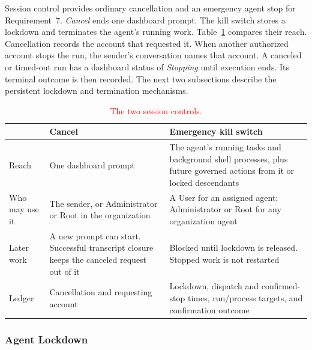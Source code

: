 {\color{red}Session control provides ordinary cancellation and an emergency agent stop
for Requirement~7. \textit{Cancel} ends one dashboard prompt. The kill
switch stores a lockdown and terminates the agent's running work.
Table~\ref{tab:gov-session-controls} compares their reach. Cancellation records
the account that requested it. When another authorized account stops the run,
the sender's conversation names that account. A canceled or timed-out run
has a dashboard status of \textit{Stopping} until execution ends. Its terminal
outcome is then recorded.
The next two subsections describe the persistent lockdown and termination
mechanisms.}

\begin{table}[htbp]
\centering
\caption{\textcolor{red}{The two session controls.}}
\label{tab:gov-session-controls}
\small
\color{red}
\begin{tabular}{@{}>{\raggedright\arraybackslash}p{}
>{\raggedright\arraybackslash}p{}
>{\raggedright\arraybackslash}p{}@{}}
\toprule
 & Cancel & Emergency kill switch \\
\midrule
Reach & One dashboard prompt & The agent's running tasks and background shell processes, plus future governed actions from it or locked descendants \\
Who may use it & The sender, or Administrator or Root in the organization & A User for an assigned agent; Administrator or Root for any organization agent \\
Later work & A new prompt can start. Successful transcript closure keeps the canceled request out of it & Blocked until lockdown is released. Stopped work is not restarted \\
Ledger & Cancellation and requesting account & Lockdown, dispatch and confirmed-stop times, run/process targets, and confirmation outcome \\
\bottomrule
\end{tabular}
\end{table}

\subsubsection{Agent Lockdown}
\label{sec:gov-agent-lockdown}

